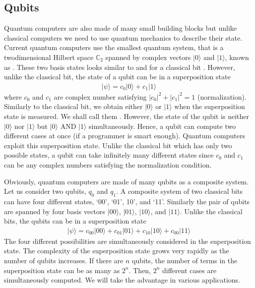 \documentclass[letterpaper,10pt,english]{jupyterBook}
\begin{document}
\subsection{Qubits}
\label{\detokenize{computation/qcomp:qubits}}
\sphinxAtStartPar
Quantum computers are also made of many small building blocks but unlike classical computers we need to use quantum mechanics to describe their state. Current quantum computers use the smallest quantum system, that is a two\sphinxhyphen{}dimensional Hilbert space \(\mathbb{C}_2\) spanned by complex vectors \(\lvert 0 \rangle\) and \(\lvert 1 \rangle\), known as . These two basis states looks similar to  and  for a classical bit . However, unlike the classical bit,  the state of a qubit  can be in a superposition state
\begin{equation}\label{equation:computation/qcomp:eqn:superposition}
\begin{split}
|\psi\rangle = c_{0} \lvert 0 \rangle + c_{1} \lvert 1 \rangle
\end{split}
\end{equation}
\sphinxAtStartPar
where \(c_0\) and \(c_1\) are complex number satisfying \(|c_0|^2+|c_1|^2=1\) (normalization). Similarly to the classical bit, we obtain either \(|0\rangle\) or \(\lvert 1 \rangle\)  when the superposition state is measured.   We shall call them . However,  the state of the qubit is neither \(\lvert 0 \rangle\) nor \(\lvert 1 \rangle\)  but  \(\lvert 0 \rangle\) AND \(\lvert 1 \rangle\) simultaneously. Hence, a qubit can compute two different cases at once (if a programmer is smart enough). Quantum computers exploit this superposition state.  Unlike the classical bit which has only two possible states, a qubit can take infinitely many different states since \(c_0\) and \(c_1\) can be any complex numbers satisfying the normalization condition.

\sphinxAtStartPar
Obviously, quantum computers are made of many qubits as a composite system. Let us consider two qubits, \(q_0\) and \(q_1\).  A composite system of two classical bits can have four different states, ‘00’, ‘01’, 10’, and ‘11’.  Similarly  the pair of qubits are spanned by four basis vectors \(\lvert 00 \rangle\), \(\lvert 01 \rangle\), \(\lvert 10 \rangle\), and \(\lvert 11 \rangle\).  Unlike the classical bits, the qubits can be in a superposition state
\begin{equation*}
\begin{split}
\lvert \psi \rangle = c_{00} \lvert 00 \rangle + c_{01} \lvert 01 \rangle + c_{10} \lvert 10 \rangle + c_{00} \lvert 11 \rangle
\end{split}
\end{equation*}
\sphinxAtStartPar
The four different possibilities are simultaneously considered in the superposition state. The complexity of the superposition state grows very rapidly as the number of qubits increases.  If there are \(n\) qubits, the number of terms in the superposition state can be as many as \(2^n\).   Then, \(2^n\) different cases are simultaneously computed. We will take the advantage in various applications.
\end{document}
